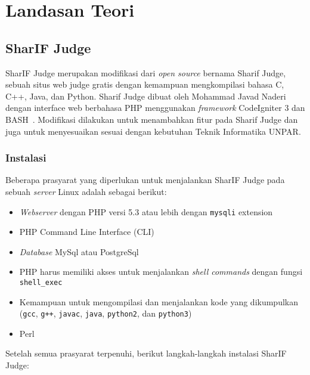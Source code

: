 \chapter{Landasan Teori}
\label{chap:teori}


\section{SharIF Judge}
\label{sec:2:sharifjudge}

SharIF Judge merupakan modifikasi dari \textit{open source} bernama Sharif Judge, sebuah situs web judge gratis dengan kemampuan mengkompilasi bahasa C, C++, Java, dan Python. Sharif Judge dibuat oleh Mohammad Javad Naderi dengan interface web berbahasa PHP menggunakan \textit{framework} CodeIgniter 3 dan BASH~\cite{javed:sharif}. Modifikasi dilakukan untuk menambahkan fitur pada Sharif Judge dan juga untuk menyesuaikan sesuai dengan kebutuhan Teknik Informatika UNPAR.

\subsection{Instalasi}
\label{sub:2:1:instalasi}

Beberapa prasyarat yang diperlukan untuk menjalankan SharIF Judge pada sebuah \textit{server} Linux adalah sebagai berikut:

\begin{itemize}
	\item \textit{Webserver} dengan PHP versi 5.3 atau lebih dengan \texttt{mysqli} extension
	\item PHP Command Line Interface (CLI)
	\item \textit{Database} MySql atau PostgreSql
	\item PHP harus memiliki akses untuk menjalankan \textit{shell commands} dengan fungsi \verb|shell_exec|
	\item Kemampuan untuk mengompilasi dan menjalankan kode yang dikumpulkan (\texttt{gcc}, \texttt{g++}, \texttt{javac}, \texttt{java}, \texttt{python2}, dan \texttt{python3})
	\item Perl
\end{itemize}

Setelah semua prasyarat terpenuhi, berikut langkah-langkah instalasi SharIF Judge:

